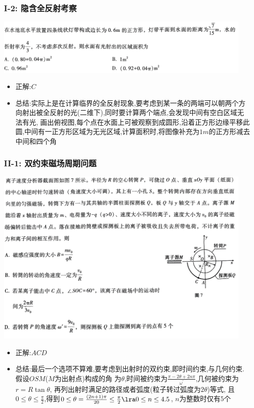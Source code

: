 \documentclass{article}
\begin{document}
\vspace{2em}

\subsubsection{I-2: 隐含全反射考察}
\includegraphics[width=0.95\textwidth,keepaspectratio]{./pictures/3.5-3.png}

\begin{itemize}
    \item 正解:\quad $C$
    \item 总结:\quad 实际上是在计算临界的全反射现象,要考虑到某一条的两端可以朝两个方向射出被全反射的光(二维下),同时要计算两个端点,会发现中间有空白区域无法有光,
          画出俯视图,每个点在水面上可被观察到成圆形,沿着正方形边缘平移此圆,中间有一正方形区域为无光区域,计算面积时,将图像补充为$1m$的正方形减去中间和四个角
\end{itemize}

\vspace{2em}

\subsubsection{II-1: 双约束磁场周期问题}
\includegraphics[width=0.95\textwidth,keepaspectratio]{./pictures/3.5-4.png}

\begin{itemize}
    \item 正解:\quad $ACD$
    \item 总结:\quad 最后一个选项不算难,要考虑到出射时的双约束,即时间约束,与几何约束.假设$OSM$($M$为出射点)构成的角
          为$\theta$,时间被约束为$\frac{\pi - 2\theta + 2n\pi}{\omega^{'}}$,几何被约束为$r = R\tan{\theta}$,
          再列出射时满足的路径或者弧度(粒子转过弧度为$2\theta$)等式,
          且$ 0 \leq \theta \leq \frac{\pi}{2}$,得到$0 \leq \theta = \frac{(2n+1)\pi}{20} \leq \frac{\pi}{2} \lra 0 \leq n \leq 4.5$,
          $n$为整数时仅有$5$个
\end{itemize}
\end{document}
